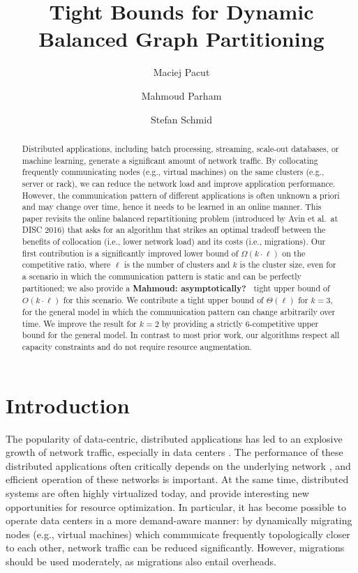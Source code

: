 \documentclass[a4paper,anonymous,USenglish]{lipics-v2019}
\title{Tight Bounds for Dynamic Balanced Graph Partitioning}
\author{Maciej Pacut}{maciej.pacut@univie.ac.at}{Faculty of Computer Science, University of Vienna,Austria}{0000-0002-6379-1490}{}
\author{Mahmoud Parham}{mahmoud.parham@univie.ac.at}{Faculty of Computer Science, University of Vienna, Austria}{0000-0002-6211-077X}{}
\author{Stefan Schmid}{stefan\_schmid@univie.ac.at}{Faculty of Computer Science, University of Vienna, Austria}{}{}
\newcommand\mahmoud[1]{\color{orange}\textbf{Mahmoud: #1~}\color{black}}
\begin{document}
\begin{abstract}
	Distributed   applications,  including  batch  processing, streaming, scale-out databases,
	or machine learning, generate a significant amount of network traffic.
	By collocating frequently communicating nodes (e.g., virtual machines) on the same clusters (e.g., server or rack), we can reduce the network load and  improve application performance. 
	However, the communication pattern of different applications is often unknown a priori and may change over time, hence it needs to be learned in an online manner.
	This paper revisits the online 
	balanced repartitioning problem 
	(introduced by Avin et al.~at DISC 2016)
	that asks for an algorithm that strikes
	an optimal tradeoff between the benefits
	of collocation (i.e., lower network load) 
	and its costs (i.e., migrations). 
	Our first contribution is a significantly improved
	lower bound of $\Omega(k\cdot \ell)$ on the
	competitive ratio, where $\ell$ is the number
	of clusters and $k$ is the cluster size,
	even for a scenario in which the communication
	pattern is static and can be perfectly partitioned;
	we also provide a \mahmoud{asymptotically?} tight upper bound 
	of $O(k\cdot \ell)$ for this scenario.
	We contribute a tight upper bound
	of $\Theta(\ell)$ for $k=3$,
	for the general model in which the
	communication pattern can change arbitrarily
	over time.
	We improve the result for $k=2$ by providing a strictly $6$-competitive upper bound for the general model.
	In contrast to most prior work, our algorithms respect all capacity constraints and do not require resource augmentation.
	
\end{abstract}

\maketitle



\section{Introduction}


The popularity of data-centric, distributed applications has led to an explosive growth of network traffic, especially in data centers \cite{roy2015inside,singh2015jupiter}.
The performance of these distributed applications often critically depends on the underlying network \cite{mogul2012we}, and efficient operation of these networks is important.
At the same time, distributed systems are often highly virtualized today, and provide interesting new opportunities for resource optimization.
In particular, it has become possible to operate data centers in a more demand-aware manner: 
by dynamically migrating nodes (e.g., virtual machines) which communicate frequently topologically closer to each other, network traffic can be reduced significantly.  
However, migrations should be used moderately, as migrations also entail overheads. 
\end{document}
